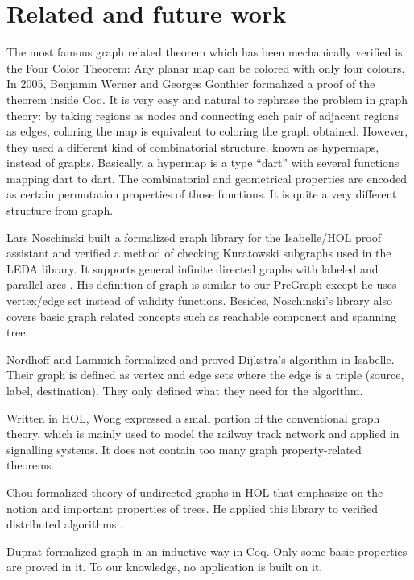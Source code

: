 \section{Related and future work}
\label{sec:related}

The most famous graph related theorem which has been mechanically
verified is the Four Color Theorem: Any planar map can be colored with
only four colours. In 2005, Benjamin Werner and Georges Gonthier
formalized a proof of the theorem \cite{gonthier2005computer} inside
Coq. It is very easy and natural to rephrase the problem in graph
theory: by taking regions as nodes and connecting each pair of
adjacent regions as edges, coloring the map is equivalent to coloring
the graph obtained. However, they used a different kind of
combinatorial structure, known as hypermaps, instead of
graphs. Basically, a hypermap is a type ``dart'' with several
functions mapping dart to dart. The combinatorial and geometrical
properties are encoded as certain permutation properties of those
functions. It is quite a very different structure from graph.

Lars Noschinski built a formalized graph library for the Isabelle/HOL
proof assistant and verified a method of checking Kuratowski subgraphs
used in the LEDA library. It supports general infinite directed graphs
with labeled and parallel arcs \cite{Noschinski2015}. His definition
of graph is similar to our PreGraph except he uses vertex/edge set
instead of validity functions. Besides, Noschinski's library also
covers basic graph related concepts such as reachable component and
spanning tree.

Nordhoff and Lammich \cite{Dijkstra_Shortest_Path-AFP} formalized and
proved Dijkstra's algorithm in Isabelle. Their graph is defined as
vertex and edge sets where the edge is a triple (source, label,
destination). They only defined what they need for the algorithm.

Written in HOL, Wong \cite{wong1991} expressed a small portion of the
conventional graph theory, which is mainly used to model the railway
track network and applied in signalling systems. It does not contain
too many graph property-related theorems.

Chou \cite{chou1994formal} formalized theory of undirected graphs in
HOL that emphasize on the notion and important properties of trees. He
applied this library to verified distributed algorithms
\cite{chou1995mechanical}.

Duprat \cite{duprat2001coq} formalized graph in an inductive way in
Coq. Only some basic properties are proved in it. To our knowledge, no
application is built on it.

